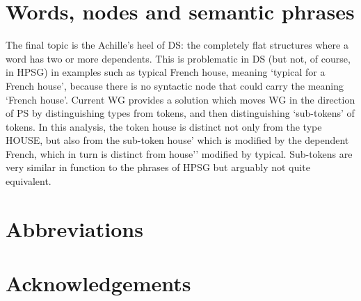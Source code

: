 \documentclass[output=paper]{langsci/langscibook}
\begin{document}
\section{Words, nodes and semantic phrases}

The final topic is the Achille’s heel of DS: the completely flat structures where a word has two or
more dependents. This is problematic in DS (but not, of course, in HPSG) in examples such as typical
French house, meaning ‘typical for a French house’, because there is no syntactic node that could
carry the meaning ‘French house’. Current WG provides a solution which moves WG in the direction of
PS by distinguishing types from tokens, and then distinguishing ‘sub-tokens’ of tokens. In this
analysis, the token house is distinct not only from the type HOUSE, but also from the sub-token
house’ which is modified by the dependent French, which in turn is distinct from house’’ modified by
typical. Sub-tokens are very similar in function to the phrases of HPSG but arguably not quite
equivalent.



 
\section*{Abbreviations}
\section*{Acknowledgements}

\printbibliography[heading=subbibliography,notkeyword=this] 
\end{document}
